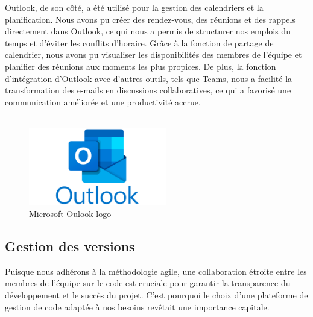 Outlook, de son côté, a été utilisé pour la gestion des calendriers et la planification. Nous avons pu créer des rendez-vous, des réunions et des rappels directement dans Outlook, ce qui nous a permis de structurer nos emplois du temps et d'éviter les conflits d'horaire. Grâce à la fonction de partage de calendrier, nous avons pu visualiser les disponibilités des membres de l'équipe et planifier des réunions aux moments les plus propices. De plus, la fonction d'intégration d'Outlook avec d'autres outils, tels que Teams, nous a facilité la transformation des e-mails en discussions collaboratives, ce qui a favorisé une communication améliorée et une productivité accrue.
\\
\\
\begin{figure}[H]
    \centering
    \includegraphics[width=6cm]{Figures/outlook.png}
    \caption{Microsoft Oulook logo}
\end{figure}



\subsection{Gestion des versions}

Puisque nous adhérons à la méthodologie agile, une collaboration étroite entre les membres de l'équipe sur le code est cruciale pour garantir la transparence du développement et le succès du projet. C'est pourquoi le choix d'une plateforme de gestion de code adaptée à nos besoins revêtait une importance capitale.

